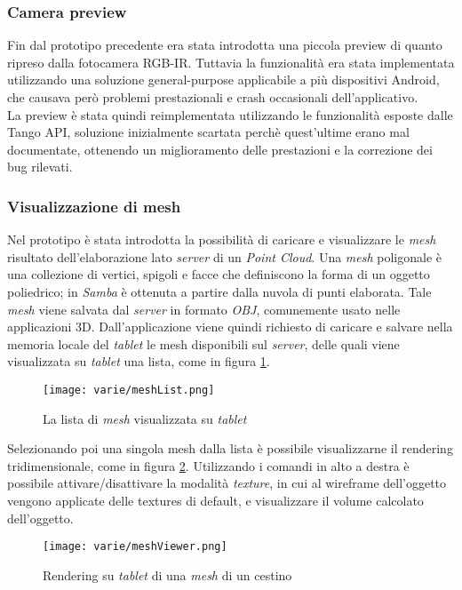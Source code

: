 \subsubsection{Camera preview}
Fin dal prototipo precedente era stata introdotta una piccola preview di quanto ripreso dalla fotocamera RGB-IR. Tuttavia la funzionalità era stata implementata utilizzando una soluzione general-purpose applicabile a più dispositivi Android, che causava però problemi prestazionali e crash occasionali dell'applicativo. \\
La preview è stata quindi reimplementata utilizzando le funzionalità esposte dalle Tango API, soluzione inizialmente scartata perchè quest'ultime erano mal documentate, ottenendo un miglioramento delle prestazioni e la correzione dei bug rilevati.

\subsubsection{Visualizzazione di mesh}
Nel prototipo è stata introdotta la possibilità di caricare e visualizzare le \emph{mesh} risultato dell'elaborazione lato \emph{server} di un \emph{Point Cloud}.
Una \emph{mesh} poligonale è una collezione di vertici, spigoli e facce che definiscono la forma di un oggetto poliedrico; in \emph{Samba} è ottenuta a partire dalla nuvola di punti elaborata.
Tale \emph{mesh} viene salvata dal \emph{server} in formato \emph{OBJ}, comunemente usato nelle applicazioni 3D. Dall'applicazione viene quindi richiesto di caricare e salvare nella memoria locale del \emph{tablet} le mesh disponibili sul \emph{server}, delle quali viene visualizzata su \emph{tablet} una lista, come in figura \ref{fig:meshListView}.
\begin{figure}[!h] 
    \centering 
    \texttt{[image: varie/meshList.png]} 
    \caption{La lista di \emph{mesh} visualizzata su \emph{tablet}}
   \label{fig:meshListView}
\end{figure}
\newline
Selezionando poi una singola mesh dalla lista è possibile visualizzarne il rendering tridimensionale, come in figura \ref{fig:meshViewer}. Utilizzando i comandi in alto a destra è possibile attivare/disattivare la modalità \emph{texture}, in cui al wireframe dell'oggetto vengono applicate delle textures di default, e visualizzare il volume calcolato dell'oggetto.
\begin{figure}[!h] 
    \centering 
    \texttt{[image: varie/meshViewer.png]} 
    \caption{Rendering su \emph{tablet} di una \emph{mesh} di un cestino}
   \label{fig:meshViewer}
\end{figure}
\newline

